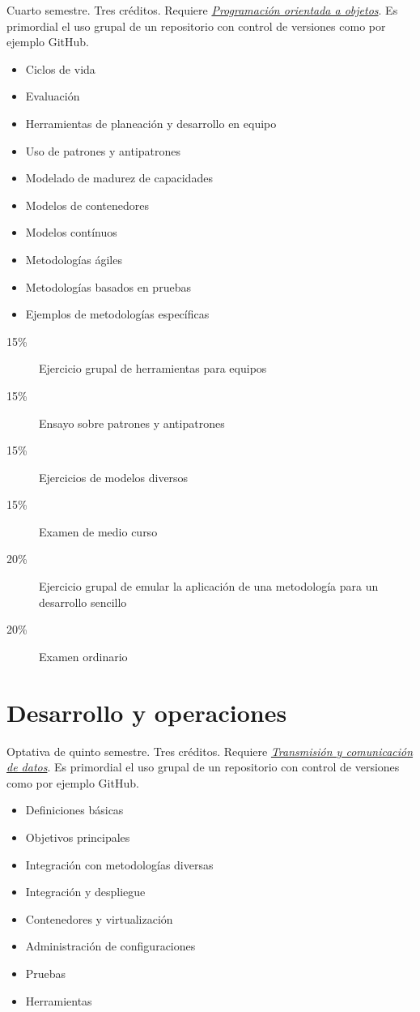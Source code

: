 \documentclass{article}
\begin{document}
\begin{multicols}{4}
Cuarto semestre. Tres cr\'{e}ditos. Requiere \hyperlink{poao}{\em
  Programaci\'{o}n orientada a objetos}. Es primordial el uso grupal
de un repositorio con control de versiones como por ejemplo GitHub.

\begin{itemize}
\item{Ciclos de vida}
\item{Evaluaci\'{o}n}
\item{Herramientas de planeaci\'{o}n y desarrollo en equipo}
\item{Uso de patrones y antipatrones}
\item{Modelado de madurez de capacidades}
\item{Modelos de contenedores}
\item{Modelos cont\'{i}nuos}
\item{Metodolog\'{i}as \'{a}giles}
\item{Metodolog\'{i}as basados en pruebas}  
\item{Ejemplos de metodolog\'{i}as espec\'{i}ficas}
\end{itemize}

\begin{description}
\item[15\%]{Ejercicio grupal de herramientas para equipos}
\item[15\%]{Ensayo sobre patrones y antipatrones}
\item[15\%]{Ejercicios de modelos diversos}  
\item[15\%]{Examen de medio curso}
\item[20\%]{Ejercicio grupal de emular la aplicaci\'{o}n de una
  metodolog\'{i}a para un desarrollo sencillo}
\item[20\%]{Examen ordinario}
\end{description}  

\vfill\null \columnbreak

\hypertarget{dyo}{\section*{Desarrollo y operaciones}} 

Optativa de quinto semestre. Tres cr\'{e}ditos. Requiere
\hyperlink{tycdd}{\em Transmisi\'{o}n y comunicaci\'{o}n de datos}.
Es primordial el uso grupal
de un repositorio con control de versiones como por ejemplo GitHub.

\begin{itemize}
\item{Definiciones b\'{a}sicas}
\item{Objetivos principales}
\item{Integraci\'{o}n con metodolog\'{i}as diversas}
\item{Integraci\'{o}n y despliegue}
\item{Contenedores y virtualizaci\'{o}n}
\item{Administraci\'{o}n de configuraciones}
\item{Pruebas}
\item{Herramientas}
\end{itemize}


\end{multicols}
\end{document}
